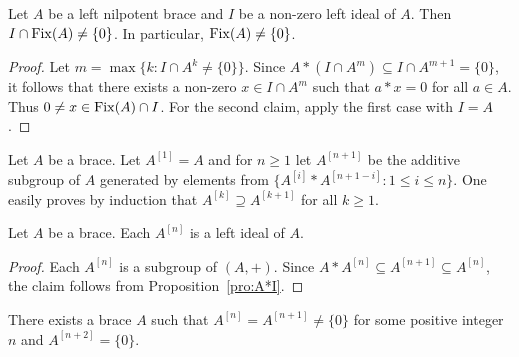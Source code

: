 \begin{proposition}
    \label{pro:IcapFix}
    Let $A$ be a left nilpotent brace and $I$ be a non-zero left ideal of
    $A$. Then $I\cap\operatorname{Fix}(A)\ne\{0\}$. In particular, $\operatorname{Fix}(A)\ne\{0\}$. 
\end{proposition}

\begin{proof}
    Let $m=\max\{k:I\cap A^k\ne\{0\}\}$. Since
    $A*(I\cap A^m)\subseteq I\cap A^{m+1}=\{0\}$,
    it follows that there exists a non-zero $x\in I\cap A^m$ such that $a*x=0$
    for all $a\in A$. Thus $0\ne x\in\operatorname{Fix}(A)\cap I$.
    For the second claim, apply the first case with $I=A$.
\end{proof}

Let $A$ be a brace.
Let $A^{[1]}=A$ and for $n\geq 1$ let $A^{[n+1]}$ be the
additive subgroup of $A$ generated by elements from
$\{A^{[i]}*A^{[n+1-i]}:1\leq i\leq n\}$.
One easily proves by induction that $A^{[k]}\supseteq
A^{[k+1]}$ for all $k\geq1$. 

\begin{proposition}
    \label{pro:Smoktunowicz}
    Let $A$ be a brace. Each $A^{[n]}$ is a left ideal of $A$.
\end{proposition}

\begin{proof}
    Each $A^{[n]}$ is a subgroup of $(A,+)$. Since
    $A*A^{[n]}\subseteq A^{[n+1]}\subseteq A^{[n]}$, the claim follows from
    Proposition~\ref{pro:A*I}.
\end{proof}

There exists a brace $A$ such that $A^{[n]}=A^{[n+1]}\ne\{0\}$
for some positive integer $n$ and $A^{[n+2]}=\{0\}$.

